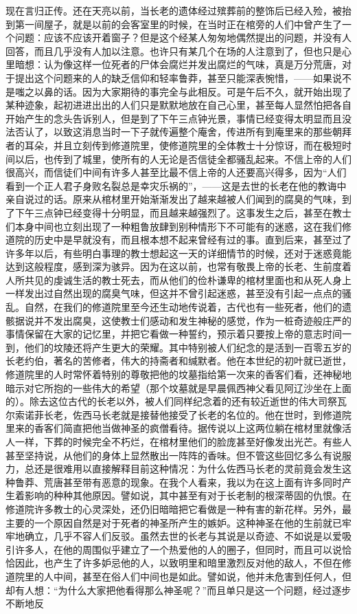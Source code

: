 \par 现在言归正传。还在天亮以前，当长老的遗体经过殡葬前的整饰后已经入殓，被抬到第一间屋子，就是以前的会客室里的时候，在当时正在棺旁的人们中曾产生了一个问题：应该不应该开着窗子？但是这个经某人匆匆地偶然提出的问题，并没有人回答，而且几乎没有人加以注意。也许只有某几个在场的人注意到了，但也只是心里暗想：认为像这样一位死者的尸体会腐烂并发出腐烂的气味，真是万分荒唐，对于提出这个问题来的人的缺乏信仰和轻率鲁莽，甚至只能深表惋惜，——如果说不是嗤之以鼻的话。因为大家期待的事完全与此相反。可是午后不久，就开始出现了某种迹象，起初进进出出的人们只是默默地放在自己心里，甚至每人显然怕把各自开始产生的念头告诉别人，但是到了下午三点钟光景，事情已经变得太明显而且没法否认了，以致这消息当时一下子就传遍整个庵舍，传进所有到庵里来的那些朝拜者的耳朵，并且立刻传到修道院里，使修道院里的全体教士十分惊讶，而在极短时间以后，也传到了城里，使所有的人无论是否信徒全都骚乱起来。不信上帝的人们很高兴，而信徒们中间有许多人甚至比最不信上帝的人还要高兴得多，因为“人们看到一个正人君子身败名裂总是幸灾乐祸的”，——这是去世的长老在他的教诲中亲自说过的话。原来从棺材里开始渐渐发出了越来越被人们闻到的腐臭的气味，到了下午三点钟已经变得十分明显，而且越来越强烈了。这事发生之后，甚至在教士们本身中间也立刻出现了一种粗鲁放肆到别种情形下不可能有的迷惑，这在我们修道院的历史中是早就没有，而且根本想不起来曾经有过的事。直到后来，甚至过了许多年以后，有些明白事理的教士想起这一天的详细情节的时候，还对于迷惑竟能达到这般程度，感到深为骇异。因为在这以前，也常有敬畏上帝的长老、生前度着人所共见的虔诚生活的教士死去，而从他们的俭朴谦卑的棺材里面也和从死人身上一样发出过自然出现的腐臭气味，但这并不曾引起迷惑，甚至没有引起一点点的骚乱。自然，在我们的修道院里至今还生动地传说着，古代也有一些死者，他们的遗骸据说并不发出腐臭，这使教士们感动和发生神秘的感觉，作为一桩奇迹般庄严的事情保留在大家的记忆里，并把它看做一种誓约，预示着只要按上帝的意志时间一到，他们的坟陵还将产生更大的荣耀。其中特别被人们纪念的是活到一百零五岁的长老约伯，著名的苦修者，伟大的持斋者和缄默者。他在本世纪的初叶就已逝世，修道院里的人时常怀着特别的尊敬把他的坟墓指给第一次来的香客们看，还神秘地暗示对它所抱的一些伟大的希望（那个坟墓就是早晨佩西神父看见阿辽沙坐在上面的）。除去这位古代的长老以外，被人们同样纪念着的还有较近逝世的伟大司祭瓦尔索诺菲长老，佐西马长老就是接替他接受了长老的名位的。他在世时，到修道院里来的香客们简直把他当做神圣的疯僧看待。据传说以上这两位躺在棺材里就像活人一样，下葬的时候完全不朽烂，在棺材里他们的脸庞甚至好像发出光芒。有些人甚至坚持说，从他们的身体上显然散出一阵阵的香味。但不管这些回忆多么有说服力，总还是很难用以直接解释目前这种情况：为什么佐西马长老的灵前竟会发生这种鲁莽、荒唐甚至带有恶意的现象。在我个人看来，我以为在这上面有许多同时产生着影响的种种其他原因。譬如说，其中甚至有对于长老制的根深蒂固的仇恨。在修道院许多教士的心灵深处，还仍旧暗暗把它看做是一种有害的新花样。另外，最主要的一个原因自然是对于死者的神圣所产生的嫉妒。这种神圣在他的生前就已牢牢地确立，几乎不容人们反驳。虽然去世的长老与其说是以奇迹、不如说是以爱吸引许多人，在他的周围似乎建立了一个热爱他的人的圈子，但同时，而且可以说恰恰因此，也产生了许多妒忌他的人，以致明里和暗里激烈反对他的敌人，不但在修道院里的人中间，甚至在俗人们中间也是如此。譬如说，他并未危害到任何人，但却有人想：“为什么大家把他看得那么神圣呢？”而且单只是这一个问题，经过逐步不断地反